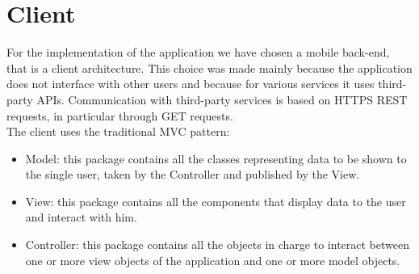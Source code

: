 \documentclass[numbers=noenddot, 12pt, a4paper, oneside]{scrbook}
\begin{document}
\section{Client}
For the implementation of the application we have chosen a mobile back-end, that is a client architecture.  This choice was made mainly because the application does not interface with other users and because for various services it uses third-party APIs. Communication with third-party services is based on HTTPS REST requests, in particular through GET requests.\\
The client uses the traditional MVC pattern:
\begin{itemize}
	\item Model: this package contains all the classes representing data to be shown to the single user, taken by the Controller and published by the View.
	\item View: this package contains all the components that display data to the user and interact with him.
	\item Controller: this package contains all the objects in charge to interact between one or more view objects of the application and one or more model objects.
\end{itemize}
\end{document}
